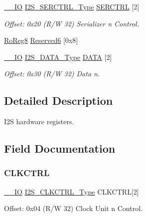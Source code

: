 \begin{DoxyCompactItemize}
\mbox{\hyperlink{core__cm0plus_8h_aec43007d9998a0a0e01faede4133d6be}{\+\_\+\+\_\+\+IO}} \mbox{\hyperlink{union_i2_s___s_e_r_c_t_r_l___type}{I2\+S\+\_\+\+S\+E\+R\+C\+T\+R\+L\+\_\+\+Type}} \mbox{\hyperlink{struct_i2s_ab2021825517d38ba0c26ce1de9efc66b}{S\+E\+R\+C\+T\+RL}} \mbox{[}2\mbox{]}
\begin{DoxyCompactList}\small\item\em Offset\+: 0x20 (R/W 32) Serializer n Control. \end{DoxyCompactList}\item 
\mbox{\hyperlink{group___s_a_m_d21_e15_a__definitions_ga0d957f1433aaf5d70e4dc2b68288442d}{Ro\+Reg8}} \mbox{\hyperlink{struct_i2s_a6c79c87b5bf6d0b4a196f3f6840b82e5}{Reserved6}} \mbox{[}0x8\mbox{]}
\item 
\mbox{\hyperlink{core__cm0plus_8h_aec43007d9998a0a0e01faede4133d6be}{\+\_\+\+\_\+\+IO}} \mbox{\hyperlink{union_i2_s___d_a_t_a___type}{I2\+S\+\_\+\+D\+A\+T\+A\+\_\+\+Type}} \mbox{\hyperlink{struct_i2s_a87228deaa60486edbc1bb08edca4e971}{D\+A\+TA}} \mbox{[}2\mbox{]}
\begin{DoxyCompactList}\small\item\em Offset\+: 0x30 (R/W 32) Data n. \end{DoxyCompactList}\end{DoxyCompactItemize}


\subsection{Detailed Description}
I2S hardware registers. 

\subsection{Field Documentation}
\mbox{\label{struct_i2s_a8b353c4384f259f83f4cb09005733121}} 
\subsubsection{\texorpdfstring{CLKCTRL}{CLKCTRL}}
{\footnotesize\ttfamily \mbox{\hyperlink{core__cm0plus_8h_aec43007d9998a0a0e01faede4133d6be}{\+\_\+\+\_\+\+IO}} \mbox{\hyperlink{union_i2_s___c_l_k_c_t_r_l___type}{I2\+S\+\_\+\+C\+L\+K\+C\+T\+R\+L\+\_\+\+Type}} C\+L\+K\+C\+T\+RL\mbox{[}2\mbox{]}}



Offset\+: 0x04 (R/W 32) Clock Unit n Control. 

